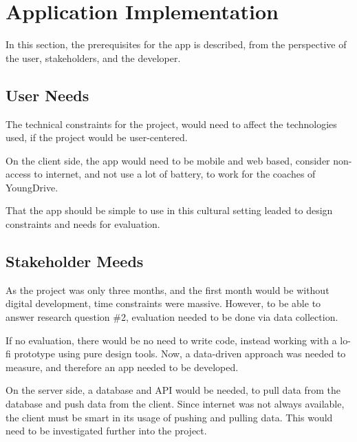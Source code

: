 \section{Application Implementation}

In this section, the prerequisites for the app is described, from the perspective of the user, stakeholders, and the developer.

\subsection{User Needs}

The technical constraints for the project, would need to affect the technologies used, if the project would be user-centered.

On the client side, the app would need to be mobile and web based, consider non-access to internet, and not use a lot of battery, to work for the coaches of YoungDrive.

That the app should be simple to use in this cultural setting leaded to design constraints and needs for evaluation.

\subsection{Stakeholder Meeds}

As the project was only three months, and the first month would be without digital development, time constraints were massive. However, to be able to answer research question \#2, evaluation needed to be done via data collection.

If no evaluation, there would be no need to write code, instead working with a lo-fi prototype using pure design tools. Now, a data-driven approach was needed to measure, and therefore an app needed to be developed.

On the server side, a database and API would be needed, to pull data from the database and push data from the client. Since internet was not always available, the client must be smart in its usage of pushing and pulling data. This would need to be investigated further into the project.









